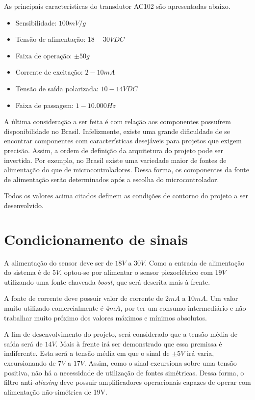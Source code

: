 \documentclass[11pt]{abntex2}
\begin{document}
				As principais características do transdutor AC102 são apresentadas
				abaixo.\cite{ctc}
				
				\begin{itemize}
					\item Sensibilidade: $100mV/g$
					\item Tensão de alimentação: $18 - 30 VDC$
					\item Faixa de operação: $\pm 50g$
					\item Corrente de excitação: $2 - 10mA$
					\item Tensão de saída polarizada: $10 - 14 VDC$
					\item Faixa de passagem: $1 - 10.000 Hz$
				\end{itemize}
				
				A última consideração a ser feita é com relação aos componentes
				possuírem disponibilidade no Brasil. Infelizmente, existe uma grande
				dificuldade de se encontrar componentes com características
				desejáveis para projetos que exigem precisão. Assim, a ordem de
				definição da arquitetura do projeto pode ser invertida. Por exemplo,
				no Brasil existe uma variedade maior de fontes de alimentação do que
				de microcontroladores. Dessa forma, os componentes da fonte de
				alimentação serão determinados após a escolha do microcontrolador.
				
				Todos os valores acima citados definem as condições de contorno do
				projeto a ser desenvolvido.

			\section{Condicionamento de sinais}

				A alimentação do sensor deve ser de $18V$ a $30V$. Como a entrada de
				alimentação do sistema é de $5V$, optou-se por alimentar o sensor
				piezoelétrico com $19V$ utilizando uma fonte chaveada \textit{boost}, que será
				descrita mais à frente.

				A fonte de corrente deve possuir valor de corrente de $2mA$ a $10mA$. Um valor muito
				utilizado comercialmente é $4mA$, por ter um consumo intermediário e não trabalhar
				muito próximo dos valores máximos e mínimos absolutos.

				A fim de desenvolvimento do projeto, será considerado que a tensão
				média de saída será de $14V$. Mais à frente irá ser demonstrado que
				essa premissa é indiferente. Esta será a tensão média em que o sinal
				de $\pm 5V$ irá varia, excursionando de $7V$ a $17V$. Assim, como o
				sinal excursiona sobre uma tensão positiva, não há a necessidade de
				utilização de fontes simétricas. Dessa forma, o filtro
				anti-\textit{aliasing} deve possuir amplificadores operacionais
				capazes de operar com alimentação não-simétrica de 19V.
\end{document}
